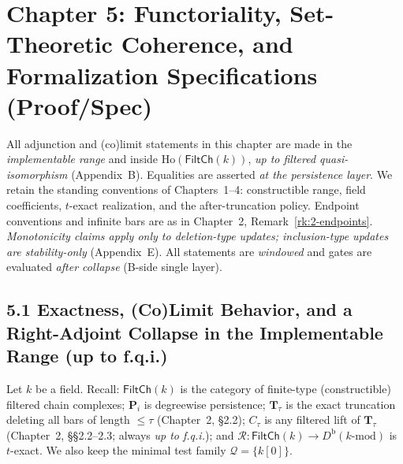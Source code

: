 \documentclass[11pt]{article}
\DeclareRobustCommand{\hyp}{\nobreakdash-}
\numberwithin{equation}{section}
\theoremstyle{definition}
\begin{document}
\section{Chapter 5: Functoriality, Set-Theoretic Coherence, and Formalization Specifications (Proof/Spec)}

All adjunction and (co)limit statements in this chapter are made in the \emph{implementable range} and inside
$\mathrm{Ho}(\mathsf{FiltCh}(k))$, \emph{up to filtered quasi\hyp isomorphism} (Appendix~B). Equalities are asserted \emph{at the persistence layer}. We retain the standing conventions of Chapters~1–4: constructible range, field coefficients, $t$-exact realization, and the after\hyp truncation policy. Endpoint conventions and infinite bars are as in Chapter~2, Remark~\ref{rk:2-endpoints}. \emph{Monotonicity claims apply only to deletion\hyp type updates; inclusion\hyp type updates are stability\hyp only} (Appendix~E). All statements are \emph{windowed} and gates are evaluated \emph{after collapse} (B-side single layer).

\subsection*{5.1 Exactness, (Co)Limit Behavior, and a Right\hyp Adjoint Collapse in the Implementable Range (up to f.q.i.)}

Let $k$ be a field. Recall: $\mathsf{FiltCh}(k)$ is the category of finite\hyp type (constructible) filtered chain complexes; $\mathbf{P}_i$ is degreewise persistence; $\mathbf{T}_\tau$ is the exact truncation deleting all bars of length $\le\tau$ (Chapter~2, §2.2); $C_\tau$ is any filtered lift of $\mathbf{T}_\tau$ (Chapter~2, §§2.2–2.3; always \emph{up to f.q.i.}); and $\mathcal{R}:\mathsf{FiltCh}(k)\to D^{\mathrm{b}}(k\text{-mod})$ is $t$-exact. We also keep the minimal test family $\mathcal{Q}=\{k[0]\}$.
\end{document}
